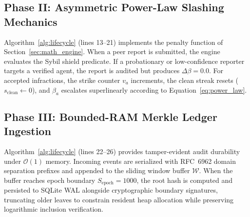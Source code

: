 \documentclass[journal]{IEEEtran}
\begin{document}
\subsection{Phase II: Asymmetric Power-Law Slashing Mechanics}
Algorithm~\ref{alg:lifecycle} (lines 13--21) implements the penalty function of Section~\ref{sec:math_engine}. When a peer report is submitted, the engine evaluates the Sybil shield predicate. If a probationary or low-confidence reporter targets a verified agent, the report is audited but produces $\Delta\beta = 0.0$. For accepted infractions, the strike counter $v_a$ increments, the clean streak resets ($s_{\text{clean}} \leftarrow 0$), and $\beta_a$ escalates superlinearly according to Equation~\eqref{eq:power_law}.

\subsection{Phase III: Bounded-RAM Merkle Ledger Ingestion}
Algorithm~\ref{alg:lifecycle} (lines 22--26) provides tamper-evident audit durability under $\mathcal{O}(1)$ memory. Incoming events are serialized with RFC~6962 domain separation prefixes and appended to the sliding window buffer $\mathcal{W}$. When the buffer reaches epoch boundary $S_{\text{epoch}} = 1000$, the root hash is computed and persisted to SQLite WAL alongside cryptographic boundary signatures, truncating older leaves to constrain resident heap allocation while preserving logarithmic inclusion verification.
\end{document}
